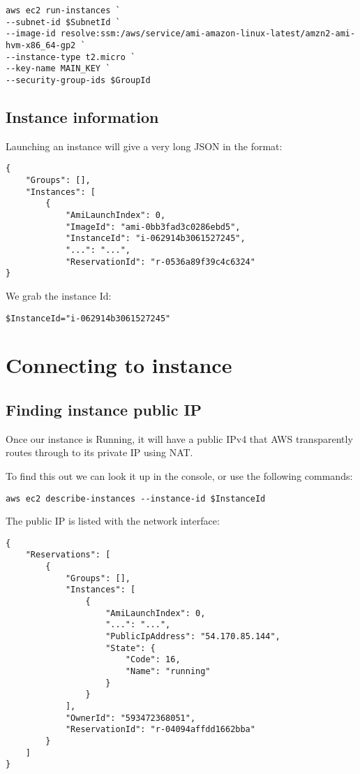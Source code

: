 \documentclass{pgnotes}
\begin{document}
\begin{verbatim}
aws ec2 run-instances `
--subnet-id $SubnetId `
--image-id resolve:ssm:/aws/service/ami-amazon-linux-latest/amzn2-ami-hvm-x86_64-gp2 `
--instance-type t2.micro `
--key-name MAIN_KEY `
--security-group-ids $GroupId
\end{verbatim}

\subsection{Instance information}\label{instance-information}

Launching an instance will give a very long JSON in the format:

\begin{verbatim}
{
    "Groups": [],
    "Instances": [
        {
            "AmiLaunchIndex": 0,
            "ImageId": "ami-0bb3fad3c0286ebd5",
            "InstanceId": "i-062914b3061527245",
            "...": "...",
            "ReservationId": "r-0536a89f39c4c6324"
}
\end{verbatim}

We grab the instance Id:
\begin{verbatim}
$InstanceId="i-062914b3061527245"
\end{verbatim}

\section{Connecting to instance}\label{sec:connecting-to-instance}

\subsection{Finding instance public
IP}\label{sec:finding-instance-public-ip}

Once our instance is Running, it will have a public IPv4 that AWS
transparently routes through to its private IP using NAT.

To find this out we can look it up in the console, or use the following
commands:

\begin{verbatim}
aws ec2 describe-instances --instance-id $InstanceId
\end{verbatim}

The public IP is listed with the network interface:

\begin{verbatim}
{
    "Reservations": [
        {
            "Groups": [],
            "Instances": [
                {
                    "AmiLaunchIndex": 0,
                    "...": "...",
                    "PublicIpAddress": "54.170.85.144",
                    "State": {
                        "Code": 16,
                        "Name": "running"
                    }
                }
            ],
            "OwnerId": "593472368051",
            "ReservationId": "r-04094affdd1662bba"
        }
    ]
}
\end{verbatim}
\end{document}
